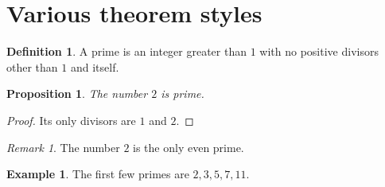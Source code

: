 \documentclass{article}
\theoremstyle{plain}
\newtheorem{proposition}[theorem]{Proposition}
\theoremstyle{definition}
\newtheorem{definition}[theorem]{Definition}
\newtheorem{example}[theorem]{Example}
\theoremstyle{remark}
\newtheorem{remark}[theorem]{Remark}
\begin{document}
\section{Various theorem styles}

\begin{definition}
\label{def:prime}
A prime is an integer greater than $1$ with no positive divisors other than $1$ and itself.
\end{definition}

\begin{proposition}
\label{prop:two-prime}
The number $2$ is prime.
\end{proposition}

\begin{proof}
Its only divisors are $1$ and $2$.
\end{proof}

\begin{remark}
\label{rem:two-only-even}
The number $2$ is the only even prime.
\end{remark}

\begin{example}
\label{ex:primes}
The first few primes are $2, 3, 5, 7, 11$.
\end{example}
\end{document}
